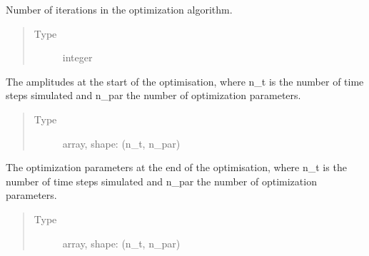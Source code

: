 \documentclass[letterpaper,10pt,english]{sphinxmanual}
\begin{document}
\begin{fulllineitems}
\begin{fulllineitems}
\begin{quote}
\begin{description}
\end{description}\end{quote}

\end{fulllineitems}


\begin{fulllineitems}
\label{\detokenize{qsim:qsim.optimization_data.OptimizationResult.num_iter}}
Number of iterations in the optimization algorithm.
\begin{quote}\begin{description}
\item[{Type}] \leavevmode
integer

\end{description}\end{quote}

\end{fulllineitems}


\begin{fulllineitems}
\label{\detokenize{qsim:qsim.optimization_data.OptimizationResult.init_parameters}}
The amplitudes at the start of the optimisation, where n\_t is
the number of time steps simulated and n\_par the number of
optimization parameters.
\begin{quote}\begin{description}
\item[{Type}] \leavevmode
array, shape: (n\_t, n\_par)

\end{description}\end{quote}

\end{fulllineitems}


\begin{fulllineitems}
\label{\detokenize{qsim:qsim.optimization_data.OptimizationResult.final_parameters}}
The optimization parameters at the end of the optimisation, where n\_t
is the number of time steps simulated and n\_par the number of
optimization parameters.
\begin{quote}\begin{description}
\item[{Type}] \leavevmode
array, shape: (n\_t, n\_par)


\end{description}
\end{quote}
\end{fulllineitems}
\end{fulllineitems}
\end{document}
